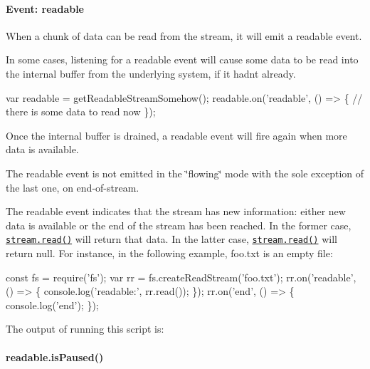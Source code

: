 \paragraph*{Event\+: \textquotesingle{}readable\textquotesingle{}}

When a chunk of data can be read from the stream, it will emit a {\ttfamily \textquotesingle{}readable\textquotesingle{}} event.

In some cases, listening for a {\ttfamily \textquotesingle{}readable\textquotesingle{}} event will cause some data to be read into the internal buffer from the underlying system, if it hadn\textquotesingle{}t already.


\begin{DoxyCode}
var readable = getReadableStreamSomehow();
readable.on('readable', () => \{
  // there is some data to read now
\});
\end{DoxyCode}


Once the internal buffer is drained, a {\ttfamily \textquotesingle{}readable\textquotesingle{}} event will fire again when more data is available.

The {\ttfamily \textquotesingle{}readable\textquotesingle{}} event is not emitted in the \char`\"{}flowing\char`\"{} mode with the sole exception of the last one, on end-\/of-\/stream.

The {\ttfamily \textquotesingle{}readable\textquotesingle{}} event indicates that the stream has new information\+: either new data is available or the end of the stream has been reached. In the former case, \href{#stream_readable_read_size}{\tt {\ttfamily stream.\+read()}} will return that data. In the latter case, \href{#stream_readable_read_size}{\tt {\ttfamily stream.\+read()}} will return null. For instance, in the following example, {\ttfamily foo.\+txt} is an empty file\+:


\begin{DoxyCode}
const fs = require('fs');
var rr = fs.createReadStream('foo.txt');
rr.on('readable', () => \{
  console.log('readable:', rr.read());
\});
rr.on('end', () => \{
  console.log('end');
\});
\end{DoxyCode}


The output of running this script is\+:




\paragraph*{readable.\+is\+Paused()}


